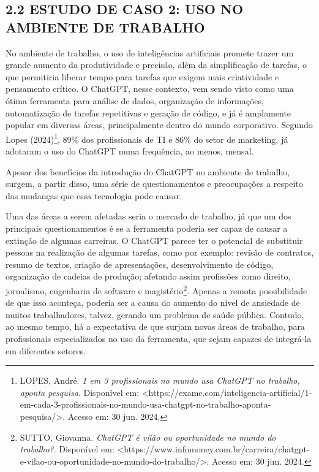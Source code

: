 \subsection*{{2.2 ESTUDO DE CASO 2: USO NO AMBIENTE DE TRABALHO}}
No ambiente de trabalho, o uso de inteligências artificiais promete trazer um grande aumento da produtividade e precisão, além da simplificação de tarefas, o que permitiria liberar tempo para tarefas que exigem mais criatividade e pensamento crítico. O ChatGPT, nesse contexto, vem sendo visto como uma ótima ferramenta para análise de dados, organização de informações, automatização de tarefas repetitivas e geração de código, e já é amplamente popular em diversas áreas, principalmente dentro do mundo corporativo. Segundo Lopes (2024)\footnote{LOPES, André. \textit{1 em 3 profissionais no mundo usa ChatGPT no trabalho, aponta pesquisa}. Disponível em: <https://exame.com/inteligencia-artificial/1-em-cada-3-profissionais-no-mundo-usa-chatgpt-no-trabalho-aponta-pesquisa/>. Acesso em: 30 jun. 2024.}, 89\% dos profissionais de TI e 86\% do setor de marketing, já adotaram o uso do ChatGPT numa frequência, ao menos, mensal.

Apesar dos benefícios da introdução do ChatGPT no ambiente de trabalho, surgem, a partir disso, uma série de questionamentos e preocupações a respeito das mudanças que essa tecnologia pode causar. 

Uma das áreas a serem afetadas seria o mercado de trabalho, já que um dos principais questionamentos é se a ferramenta poderia ser capaz de causar a extinção de algumas carreiras. O ChatGPT parece ter o potencial de substituir pessoas na realização de algumas tarefas, como por exemplo: revisão de contratos, resumo de textos, criação de apresentações, desenvolvimento de código, organização de cadeias de produção; afetando assim profissões como direito, jornalismo, engenharia de software e magistério\footnote{SUTTO, Giovanna. \textit{ChatGPT é vilão ou oportunidade no mundo do trabalho?}. Disponível em: <https://www.infomoney.com.br/carreira/chatgpt-e-vilao-ou-oportunidade-no-mundo-do-trabalho/>. Acesso em: 30 jun. 2024.}. Apenas a remota possibilidade de que isso aconteça, poderia ser a causa do aumento do nível de ansiedade de muitos trabalhadores, talvez, gerando um problema de saúde pública. Contudo, ao mesmo tempo, há a expectativa de que surjam novas áreas de trabalho,  para profissionais especializados no uso da ferramenta, que sejam capazes de integrá-la em diferentes setores.

